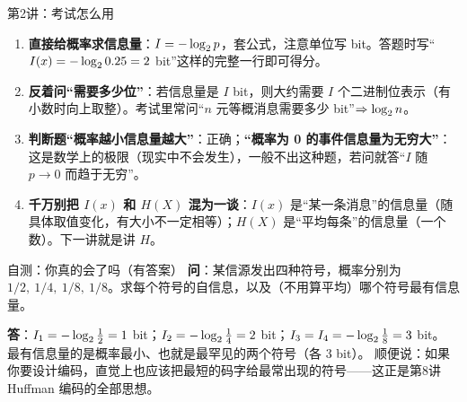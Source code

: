 \begin{exam}{第2讲：考试怎么用}
\begin{enumerate}[leftmargin=1.6em,itemsep=1pt,topsep=2pt]
  \item \textbf{直接给概率求信息量}：$I=-\log_{2} p$，套公式，注意单位写 bit。答题时写“$I(x)=-\log_{2} 0.25=2$ bit”这样的完整一行即可得分。
  \item \textbf{反着问“需要多少位”}：若信息量是 $I$ bit，则大约需要 $I$ 个二进制位表示（有小数时向上取整）。考试里常问“$n$ 元等概消息需要多少 bit”$\Rightarrow \log_{2} n$。
  \item \textbf{判断题“概率越小信息量越大”}：正确；\textbf{“概率为 0 的事件信息量为无穷大”}：这是数学上的极限（现实中不会发生），一般不出这种题，若问就答“$I$ 随 $p\to0$ 而趋于无穷”。
  \item \textbf{千万别把 $I(x)$ 和 $H(X)$ 混为一谈}：$I(x)$ 是“某一条消息”的信息量（随具体取值变化，有大小不一定相等）；$H(X)$ 是“平均每条”的信息量（一个数）。下一讲就是讲 $H$。
\end{enumerate}
\end{exam}

\begin{qa}{自测：你真的会了吗（有答案）}
\textbf{问}：某信源发出四种符号，概率分别为 $1/2,\ 1/4,\ 1/8,\ 1/8$。求每个符号的自信息，以及（不用算平均）哪个符号最有信息量。

\textbf{答}：$I_1=-\log_{2}\frac12=1$ bit；$I_2=-\log_{2}\frac14=2$ bit；$I_3=I_4=-\log_{2}\frac18=3$ bit。
最有信息量的是概率最小、也就是最罕见的两个符号（各 3 bit）。
顺便说：如果你要设计编码，直觉上也应该把最短的码字给最常出现的符号——这正是第8讲 Huffman 编码的全部思想。
\end{qa}
